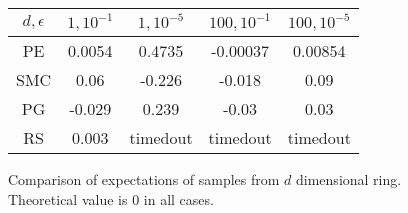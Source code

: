 \begin{figure}
\begin{center}
	\begin{tabular}{||c| c c c c||} 
	\hline
	 $d,\epsilon$& $1, {10^{-1}}$ & $1, {10^{-5}}$ & ${100}, {10^{-1}}$ & ${100}, {10^{-5}}$ \\ [0.5ex] 
	\hline\hline
	PE & 0.0054 & 0.4735  & -0.00037 & 0.00854\\ 
	\hline
	SMC & 0.06 & -0.226  & -0.018 & 0.09\\ 
	\hline
	PG & -0.029 & 0.239 & -0.03 & 0.03\\
	\hline
	RS & 0.003 & timedout & timedout & timedout \\
	\hline
 \end{tabular}
 \label{results}
 \caption{Comparison of expectations of samples from $d$ dimensional ring.  Theoretical value is 0 in all cases.}
 \end{center}
\end{figure}


  